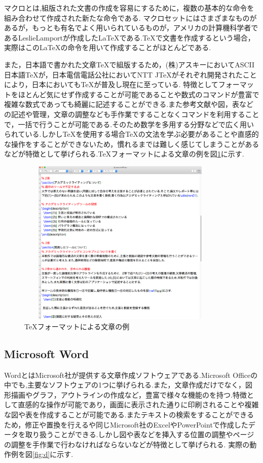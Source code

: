 \documentclass[a4j,12pt]{jarticle}
\begin{document}
マクロとは,組版された文書の作成を容易にするために，複数の基本的な命令を組み合わせて作成された新たな命令である.
マクロセットにはさまざまなものがあるが，もっとも有名でよく用いられているものが，アメリカの計算機科学者であるLeslieLamportが作成した\LaTeX である.\TeX で文書を作成するという場合，実際はこの\LaTeX の命令を用いて作成することがほとんどである.

また，日本語で書かれた文章\TeX で組版するため，(株)アスキーにおいてASCII日本語\TeX が，日本電信電話公社においてNTT J\TeX がそれぞれ開発されたことにより，日本においても\TeX が普及し現在に至っている\cite{ren3}.
特徴としてフォーマットをほとんど気にせず作成することが可能であることや数式のコマンドが豊富で複雑な数式であっても綺麗に記述することができる.また参考文献や図，表などの記述や管理，文章の調整なども手作業ですることなくコマンドを利用することで，一括で行うことが可能である.そのため数学を多用する分野などで広く用いられている.しかし\TeX を使用する場合\TeX の文法を学ぶ必要があることや直感的な操作をすることができないため，慣れるまでは難しく感じてしまうことがあるなどが特徴として挙げられる.\TeX フォーマットによる文章の例を図\ref{fig:c}に示す.

\begin{figure}[H]
\begin{center}
 \includegraphics[clip,width=100mm,height=80mm]{figure/TEX.png}
 \end{center}
 \caption{\TeX フォーマットによる文章の例}
 \label{fig:c}
\end{figure}

\newpage
\subsection{Microsoft Word}
WordとはMicrosoft社が提供する文章作成ソフトウェアである.Microsoft Officeの中でも,主要なソフトウェアの1つに挙げられる.また，文章作成だけでなく，図形描画やグラフ，アウトラインの作成など，豊富で様々な機能のを持つ.特徴として直感的な操作が可能であり，画面に表示された通りに印刷されることや複雑な図や表を作成することが可能である.またテキストの検索をすることができるため，修正や置換を行えるや同じMicrosoft社のExcelやPowerPointで作成したデータを取り扱うことができる.しかし図や表などを挿入する位置の調整やページの調整を手作業で行わなければならないなどが特徴として挙げられる.
実際の動作例を図\ref{fig:d}に示す.
\end{document}
